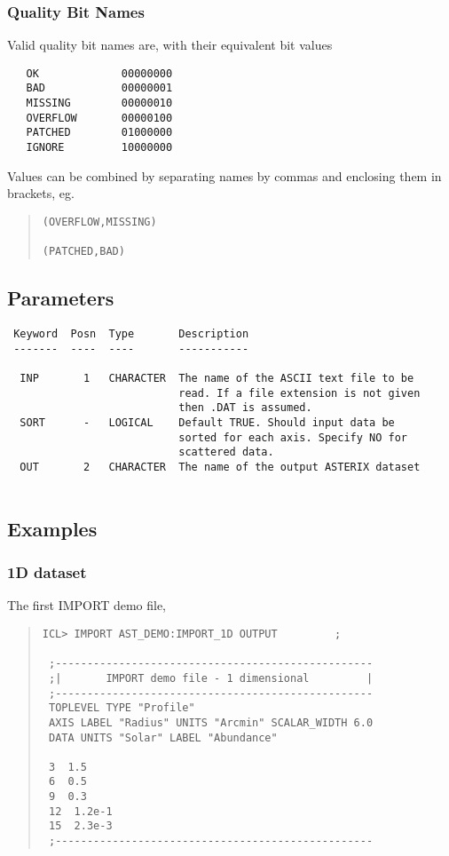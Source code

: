 \documentclass{book}
\renewcommand{\_}{{\tt\char'137}}     %
\begin{document}
\subsubsection{Quality Bit Names}
Valid quality bit names are, with their equivalent bit values
\begin{verbatim}
   OK             00000000
   BAD            00000001
   MISSING        00000010
   OVERFLOW       00000100
   PATCHED        01000000
   IGNORE         10000000
\end{verbatim}
Values can be combined by separating names by commas and enclosing
them in brackets, eg.
\begin{quote}\begin{verbatim}
(OVERFLOW,MISSING)
 
(PATCHED,BAD)
\end{verbatim}\end{quote}
\subsection{Parameters}
\begin{verbatim}
 Keyword  Posn  Type       Description
 -------  ----  ----       -----------
 
  INP       1   CHARACTER  The name of the ASCII text file to be
                           read. If a file extension is not given
                           then .DAT is assumed.
  SORT      -   LOGICAL    Default TRUE. Should input data be
                           sorted for each axis. Specify NO for
                           scattered data.
  OUT       2   CHARACTER  The name of the output ASTERIX dataset
 
\end{verbatim}\subsection{Examples}
\subsubsection{1D dataset}
The first IMPORT demo file,
 
\begin{quote}\begin{verbatim}
ICL> IMPORT AST_DEMO:IMPORT_1D OUTPUT         ;
 
 ;--------------------------------------------------
 ;|       IMPORT demo file - 1 dimensional         |
 ;--------------------------------------------------
 TOPLEVEL TYPE "Profile"
 AXIS LABEL "Radius" UNITS "Arcmin" SCALAR_WIDTH 6.0
 DATA UNITS "Solar" LABEL "Abundance"
 
 3  1.5
 6  0.5
 9  0.3
 12  1.2e-1
 15  2.3e-3
 ;--------------------------------------------------
\end{verbatim}\end{quote}
\end{document}
